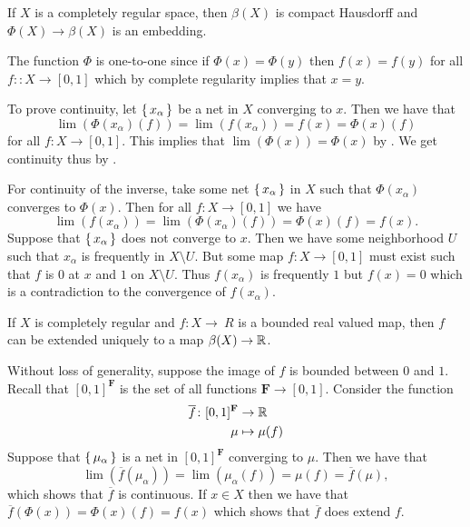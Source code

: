 \documentclass[letterpaper, 11pt, oneside]{book}
\begin{document}
\clearpage

\begin{thrm}
  If $X$ is a completely regular space, then $\beta(X)$ is compact Hausdorff and $\Phi(X) \to \beta(X)$ is an embedding.
\end{thrm}
\begin{pf}
  The function $\Phi$ is one-to-one since if $\Phi(x) = \Phi(y)$ then $f(x) = f(y)$ for all $f\colon: X \to [0, 1]$ which by complete regularity implies that $x = y$.

  To prove continuity, let $\set{x_{\alpha}}$ be a net in $X$ converging to $x$.
  Then we have that
  \[
    \lim(\Phi(x_{\alpha})(f)) = \lim(f(x_{\alpha})) = f(x) = \Phi(x)(f)
  \]
  for all $f\colon X \to [0, 1]$.
  This implies that $\lim(\Phi(x)) = \Phi(x)$ by .
  We get continuity thus by .

  For continuity of the inverse, take some net $\set{x_{\alpha}}$ in $X$ such that $\Phi(x_{\alpha})$ converges to $\Phi(x)$.
  Then for all $f\colon X \to [0, 1]$ we have
  \[
    \lim(f(x_{\alpha})) = \lim(\Phi(x_{\alpha})(f)) = \Phi(x)(f) = f(x).
  \]
  Suppose that $\set{x_{\alpha}}$ does not converge to $x$.
  Then we have some neighborhood $U$ such that $x_{\alpha}$ is frequently in $X \setminus U$.
  But some map $f\colon X \to [0, 1]$ must exist such that $f$ is $0$ at $x$ and $1$ on $X \setminus U$.
  Thus $f(x_{\alpha})$ is frequently $1$ but $f(x) = 0$ which is a contradiction to the convergence of $f(x_{\alpha})$.
\end{pf}

\begin{thrm}
  If $X$ is completely regular and $f\colon X \to\ R$ is a bounded real valued map, then $f$ can be extended uniquely to a map $\beta(X) \to \mathbb{R}$.
\end{thrm}
\begin{pf}
  Without loss of generality, suppose the image of $f$ is bounded between $0$ and $1$.
  Recall that $[0, 1]^{\textbf{F}}$ is the set of all functions $\textbf{F} \to [0, 1]$.
  Consider the function
  \begin{align*}
    \overline{f}\colon [0, 1]^{\textbf{F}} &\to \mathbb{R} \\
                \mu &\mapsto \mu(f)
  \end{align*}
  Suppose that $\set{\mu_{\alpha}}$ is a net in $[0, 1]^{\textbf{F}}$ converging to $\mu$.
  Then we have that
  \[
    \lim(\overline{f}(\mu_{\alpha})) = \lim(\mu_{\alpha}(f)) = \mu(f) = \overline{f}(\mu),
  \]
  which shows that $\overline{f}$ is continuous.
  If $x \in X$ then we have that $\overline{f}(\Phi(x)) = \Phi(x)(f) = f(x)$ which shows that $\overline{f}$ does extend $f$.
\end{pf}
\end{document}
